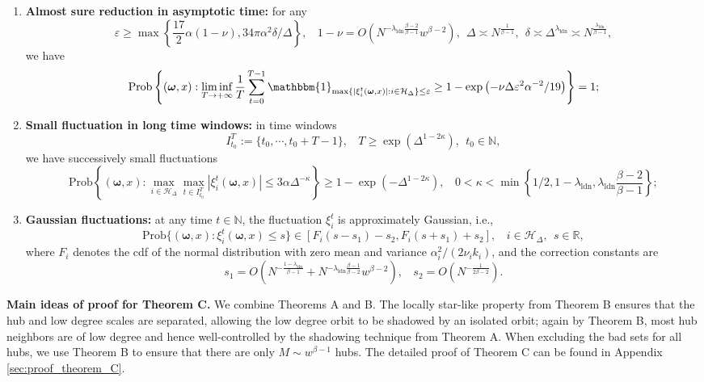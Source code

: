 \documentclass[a4paper]{article}
\theoremstyle{plain}
\theoremstyle{definition}
\newcommand{\R}{\mathbb{R}}
\newcommand{\T}{\mathbb{T}}
\newcommand{\N}{\mathbb{N}}
\newcommand{\Hil}{\mathcal{H}}
\newcommand{\One}{\mathbbm{1}}
\begin{document}
\begin{enumerate}
	\item[$\mathrm{(i)}$] \textbf{Almost sure reduction in asymptotic time:} for any
	$$\varepsilon\geq \max\left\{ \frac{17}{2} \alpha (1-\nu), 34\pi\alpha^2\delta / \Delta \right\},~~~~1-\nu=O\left(N^{-\lambda_{\mathrm{ldn}}\frac{\beta-2}{\beta-1}} w^{\beta-2}\right),~~\Delta \asymp N^{\frac{1}{\beta-1}},~~\delta \asymp \Delta^{\lambda_{\mathrm{ldn}}} \asymp N^{\frac{\lambda_{\mathrm{ldn}}}{\beta-1}},$$
	we have
	\[
	\mathrm{Prob} \left\{ (\boldsymbol{\omega},x): \liminf_{T\to+\infty} \frac{1}{T}\sum_{t=0}^{T-1} \One_{\max\{|\xi_i^t(\boldsymbol{\omega},x)|:i\in\Hil_{\Delta}\}\leq \varepsilon} \geq 1-  \exp\left(-\nu\Delta\varepsilon^2\alpha^{-2}/19\right) \right\} =1;
	\]
	\item[$\mathrm{(ii)}$] \textbf{Small fluctuation in long time windows:} in time windows 
	$$I_{t_0}^T:=\{t_0,\cdots,t_0+T-1\},~~~~T\geq \exp(\Delta^{1-2\kappa}),~~t_0\in\N,$$
	we have successively small fluctuations
	\[
	\mathrm{Prob} \left\{ (\boldsymbol{\omega},x): \max_{i\in\Hil_{\Delta}} \max_{t\in I_{t_0}^T} |\xi_i^t(\boldsymbol{\omega},x)| \leq 3\alpha \Delta^{-\kappa}  \right\} \geq 1-\exp(-\Delta^{1-2\kappa}), ~~~~0<\kappa <\min\left\{1/2, 1-\lambda_{\mathrm{ldn}}, \lambda_{\mathrm{ldn}}\frac{\beta-2}{\beta-1}\right\};
	\]
	\item[$\mathrm{(iii)}$] \textbf{Gaussian fluctuations:} at any time $t\in\N$, the fluctuation $\xi_i^t$ is approximately Gaussian, i.e.,
	$$\mathrm{Prob}\{(\boldsymbol{\omega},x):\xi_i^t(\boldsymbol{\omega},x)\leq s\}  \in [F_i(s-s_1) - s_2, F_i(s+s_1)+s_2],~~~~i\in\Hil_{\Delta},~~s\in\R,$$
	where  $F_i$ denotes the cdf of the normal distribution with zero mean and variance $\alpha_i^2/(2\nu_i k_i)$, and the correction constants are $$s_1=O(N^{-\frac{1-\lambda_{\mathrm{ldn}}}{\beta-1}} + N^{-\lambda_{\mathrm{ldn}} \frac{\beta-1}{\beta-2}} w^{\beta-2}),~~~~s_2=O(N^{-\frac{1}{2\beta-2}}).$$
\end{enumerate}


\textbf{Main ideas of proof for Theorem C.} We combine Theorems A and B. The locally star-like property from Theorem B ensures that the hub and low degree scales are separated, allowing the low degree orbit to be shadowed by an isolated orbit; again by Theorem B, most hub neighbors are of low degree and hence well-controlled by the shadowing technique from Theorem A. When excluding the bad sets for all hubs, we use Theorem B to ensure that there are only $M\sim w^{\beta-1}$ hubs. The detailed proof of Theorem C can be found in Appendix \ref{sec:proof_theorem_C}.
\end{document}
